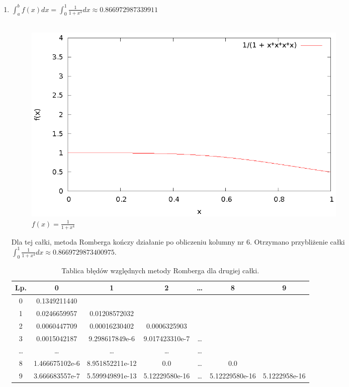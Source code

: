 \documentclass{article}
\begin{document}
\begin{enumerate}
	\item $\int_a^b f(x) dx = \int_0^1 \frac{1}{1 + x^4} dx \approx 0.866972987339911$ \\ \\
	\begin{figure}[H]
		\centering
		\includegraphics[width=0.8\textwidth]{wykresy/2.eps}
		\caption{$f(x) = \frac{1}{1 + x^4}$}
	\end{figure}
	Dla tej całki, metoda Romberga kończy działanie po obliczeniu kolumny nr 6.
	Otrzymano przybliżenie całki $\int_0^1 \frac{1}{1 + x^4} dx \approx 0.8669729873400975$.

	\begin{table}[h]
	\centering
	\begin{tabular}[c]{|c|c|c|c|c|c|c|}
	\hline
	Lp. & 0 & 1 & 2 & \ldots & 8 & 9 \\
	\hline
	0 & 0.1349211440	& & & & & \\
 	1 & 0.0246659957 & 0.01208572032	& & & & \\
 	2 & 0.0060447709 & 0.00016230402 & 0.0006325903 & & & \\
 	3 & 0.0015042187 & 9.298617849e-6 & 9.017423310e-7	& \dots & & \\
	\dots & \dots & \dots & \dots & \dots & & \\
	8 & 1.466675102e-6 & 8.951852211e-12 & 0.0 & \dots & 0.0 &  \\
	9 & 3.666683557e-7 & 5.599949891e-13 & 5.12229580e-16 & \dots & 5.12229580e-16 & 5.1222958e-16 \\
	\hline
	\end{tabular}
	\caption{Tablica błędów względnych metody Romberga dla drugiej całki.}
	\end{table}


\end{enumerate}
\end{document}
